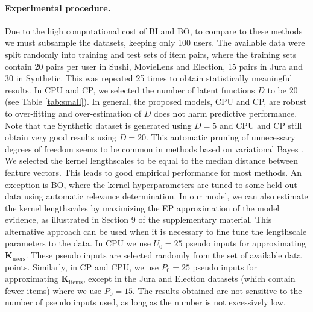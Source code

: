 \paragraph{Experimental procedure.} Due to the high computational cost of BI and BO, to compare to these methods we must subsample the datasets, keeping only 100 users.
The available data were split randomly into training and test sets of item pairs,
where the training sets contain 20 pairs per user in Sushi, MovieLens and Election, 15 pairs in Jura and
30 in Synthetic. This was repeated 25 times to obtain statistically meaningful results.
In CPU and CP, we selected the number of latent functions $D$ to be $20$ (see Table \ref{tab:small}).
In general, the proposed models, CPU and CP, are robust to over-fitting and over-estimation of
$D$ does not harm predictive performance. Note that the Synthetic dataset is generated
using $D=5$ and CPU and CP still obtain very good results using $D = 20$.
This automatic pruning of unnecessary degrees of freedom seems to be common
in methods based on variational Bayes \cite{MacKay2001}.
We selected the kernel lengthscales to be equal to
the median distance between feature vectors. This leads to good empirical performance
for most methods. An exception is BO, where the kernel hyperparameters
are tuned to some held-out data using automatic relevance determination.
In our model, we can also estimate the kernel
lengthscales by maximizing the EP approximation of the model evidence,
as illustrated in Section 9 of the supplementary material. This alternative approach can be used
when it is necessary to fine tune the lengthscale parameters to the data. In CPU we use $U_0 = 25$ pseudo inputs for approximating $\mathbf{K}_\text{users}$.
These pseudo inputs are selected randomly from the set of available data points.
Similarly, in CP and CPU, we use $P_0 = 25$ pseudo inputs for approximating $\mathbf{K}_\text{items}$,
except in the Jura and Election datasets (which contain fewer items) where we use $P_0 = 15$.
The results obtained are not sensitive to the number of pseudo inputs used, as long as
the number is not excessively low.



